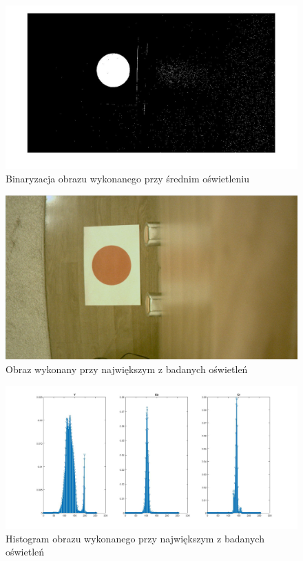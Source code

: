 \begin{figure}[h]
	\centering
	\includegraphics[width=\textwidth]{bin2.jpg}
	\caption{Binaryzacja obrazu wykonanego przy średnim oświetleniu}
	\label{fig:bin2}
\end{figure}
\begin{figure}[h]
	\centering
	\includegraphics[width=\textwidth]{osw3.jpg}
	\caption{Obraz wykonany przy największym z badanych oświetleń}
	\label{fig:osw3}
\end{figure}
\begin{figure}[h]
	\centering
	\includegraphics[width=\textwidth]{hist3.jpg}
	\caption{Histogram obrazu wykonanego przy największym z badanych oświetleń}
	\label{fig:hist3}
\end{figure}
